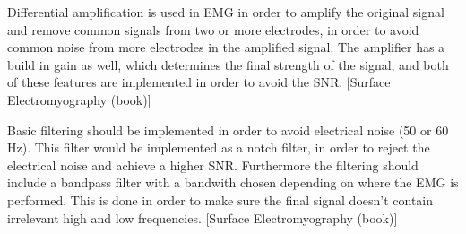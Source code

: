 Differential amplification is used in EMG in order to amplify the original signal and remove common signals from two or more electrodes, in order to avoid common noise from more electrodes in the amplified signal. The amplifier has a build in gain as well, which determines the final strength of the signal, and both of these features are implemented in order to avoid the SNR. [Surface Electromyography (book)]

Basic filtering should be implemented in order to avoid electrical noise (50 or 60 Hz). This filter would be implemented as a notch filter, in order to reject the electrical noise and achieve a higher SNR. Furthermore the filtering should include a bandpass filter with a bandwith chosen depending on where the EMG is performed. This is done in order to make sure the final signal doesn't contain irrelevant high and low frequencies. [Surface Electromyography (book)]